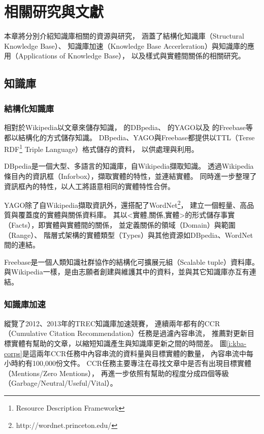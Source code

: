 %
%
%
\chapter{相關研究與文獻}
\label{c:related}

本章將分別介紹知識庫相關的資源與研究，
涵蓋了結構化知識庫（Structural Knowledge Base）、
知識庫加速（Knowledge Base Accerleration）與知識庫的應用（Applications of Knowledge Base），
以及樣式與實體間關係的相關研究。

\section{知識庫}
\subsection{結構化知識庫}
相對於Wikipedia以文章來儲存知識，\cite{dbpedia} 的DBpedia、
\cite{yago} 的YAGO以及\cite{freebase} 的Freebase等都以結構化的方式儲存知識。
DBpedia、YAGO與Freebase都提供以TTL（Terse RDF\footnote{Resource Description Framework} Triple Language）格式儲存的資料，
以供處理與利用。

DBpedia是一個大型、多語言的知識庫，自Wikipedia擷取知識。
透過Wikipedia條目內的資訊框（Inforbox），擷取實體的特性，並連結實體。
同時進一步整理了資訊框內的特性，以人工將語意相同的實體特性合併。

YAGO除了自Wikipedia擷取資訊外，還搭配了WordNet\footnote{http://wordnet.princeton.edu/}，
建立一個輕量、高品質與覆蓋度的實體與關係資料庫。
其以<實體,關係,實體>的形式儲存事實（Facts），即實體與實體間的關係，
並定義關係的領域（Domain）與範圍（Range）、
階層式架構的實體類型（Types）與其他資源如DBpedia、WordNet間的連結。

Freebase是一個人類知識社群協作的結構化可擴展元組（Scalable tuple）資料庫。
與Wikipedia一樣，是由志願者創建與維護其中的資料，並與其它知識庫亦互有連結。

\subsection{知識庫加速}

\cite{kba2012,kba2013}縱覽了2012、2013年的TREC知識庫加速競賽，
連續兩年都有的CCR（Cumulative Citation Recommendation）任務是過濾內容串流，
推薦對更新目標實體有幫助的文章，以縮短知識產生與知識庫更新之間的時間差。
圖\ref{i:kba-corps}是這兩年CCR任務中內容串流的資料量與目標實體的數量，
內容串流中每小時約有100,000份文件。
CCR任務主要專注在尋找文章中是否有出現目標實體（Mentions/Zero Mentions），
再進一步依照有幫助的程度分成四個等級（Garbage/Neutral/Useful/Vital）。

